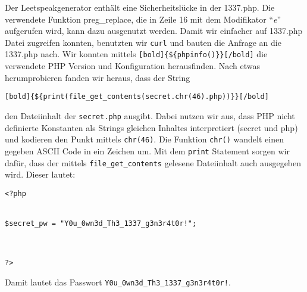 \documentclass[10pt,a4paper]{article}
\begin{document}
Der Leetspeakgenerator enthält eine Sicherheitslücke in der 1337.php. Die verwendete Funktion preg\_replace, die in Zeile 16 mit dem Modifikator "`\textit{e}"' aufgerufen wird, kann dazu ausgenutzt werden. Damit wir einfacher auf 1337.php Datei zugreifen konnten, benutzten wir \texttt{curl} und bauten die Anfrage an die 1337.php nach. Wir konnten mittels \texttt{[bold]\{\$\{phpinfo()\}\}[/bold]} die verwendete PHP Version und Konfiguration herausfinden. Nach etwas herumprobieren fanden wir heraus, dass der String 
\begin{verbatim}
[bold]{${print(file_get_contents(secret.chr(46).php))}}[/bold] 
\end{verbatim}
den Dateiinhalt der \texttt{secret.php} ausgibt. Dabei nutzen wir aus, dass PHP nicht definierte Konstanten als Strings gleichen Inhaltes interpretiert (secret und php) und kodieren den Punkt mittels \texttt{chr(46)}. Die Funktion \texttt{chr()} wandelt einen gegeben ASCII Code in ein Zeichen um. Mit dem \texttt{print} Statement sorgen wir dafür, dass der mittels \texttt{file\_get\_contents} gelesene Dateiinhalt auch ausgegeben wird.
Dieser lautet:
\begin{verbatim}
<?php


$secret_pw = "Y0u_0wn3d_Th3_1337_g3n3r4t0r!";



?>
\end{verbatim}
Damit lautet das Passwort \texttt{Y0u\_0wn3d\_Th3\_1337\_g3n3r4t0r!}. 
\end{document}

